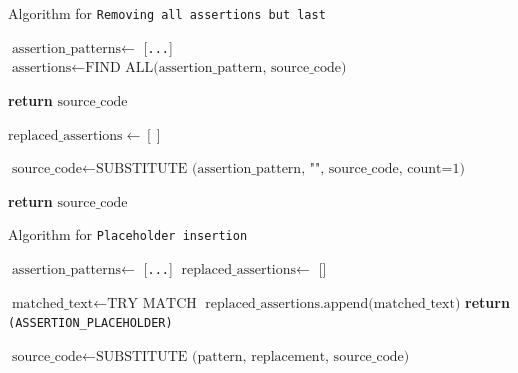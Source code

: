 \begin{enumerate}
\begin{enumerate}
        \begin{algorithm}
        \caption{Algorithm for \texttt{Removing all assertions but last}}
        \label{algorithm_remove_assertion}
        \begin{algorithmic}[1]
            \State $\text{assertion\_patterns} \gets$ [\texttt{...}] 
            \State $\text{assertions} \gets \text{FIND ALL(assertion\_pattern, source\_code)}$
        
                \State \textbf{return} $\text{source\_code}$
            \EndIf
        
            \State $\text{replaced\_assertions} \gets []$
        
                \State $\text{source\_code} \gets \text{SUBSTITUTE (assertion\_pattern, "", source\_code, count=1)}$
            \EndFor
        
            \State \textbf{return} $\text{source\_code}$
        \EndFunction
        \end{algorithmic}
        \end{algorithm}
        
        \begin{algorithm}
        \caption{Algorithm for \texttt{Placeholder insertion}}
        \label{algorithm_placeholder_insertion}
        \begin{algorithmic}[1]
            \State $\text{assertion\_patterns} \gets$ [\texttt{...}] 
            \State $\text{replaced\_assertions} \gets$ [] 
        
                    \State $\text{matched\_text} \gets \text{TRY MATCH}$
                    \State $\text{replaced\_assertions.append(matched\_text)}$
                    \State \textbf{return} \texttt{(ASSERTION\_PLACEHOLDER)}
                \EndFunction
        
                \State $\text{source\_code} \gets \text{SUBSTITUTE (pattern, replacement, source\_code)}$
            \EndFor
        

\end{algorithmic}
\end{algorithm}
\end{enumerate}
\end{enumerate}
